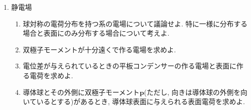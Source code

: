 \documentclass[11pt,a4paper]{jarticle}
\title{}
\author{}
\date{}
\begin{document}
\maketitle
\begin{enumerate}
    \item 静電場
    \begin{enumerate}
        \item 球対称の電荷分布を持つ系の電場について議論せよ. 特に一様に分布する場合と表面にのみ分布する場合について考えよ.
        \item 双極子モーメントが十分遠くで作る電場を求めよ.
        \item 電位差が与えられているときの平板コンデンサーの作る電場と表面に作る電荷を求めよ.
        \item 導体球とその外側に双極子モーメント$\bm{p}$(ただし, 向きは導体球の外側を向いているとする)があるとき, 導体球表面に与えられる表面電荷を求めよ.
    \end{enumerate}
\end{enumerate}
\end{document}
